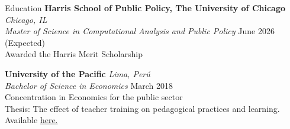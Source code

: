 \documentclass{resume} %
\begin{document}
\begin{rSection}{Education}
    {\bf Harris School of Public Policy, The University of Chicago} \hfill \textit{Chicago, IL} \\
    \textit{Master of Science in Computational Analysis and Public Policy} \hfill {June 2026 (Expected)} \\
    Awarded the Harris Merit Scholarship

    {\bf University of the Pacific} \hfill \textit{Lima, Perú} \\
    \textit{Bachelor of Science in Economics} \hfill {March 2018} \\
    Concentration in Economics for the public sector \\
    Thesis: The effect of teacher training on pedagogical practices and learning. Available \href{https://repositorio.up.edu.pe/handle/11354/2653}{here.} 
\end{rSection}
\end{document}

